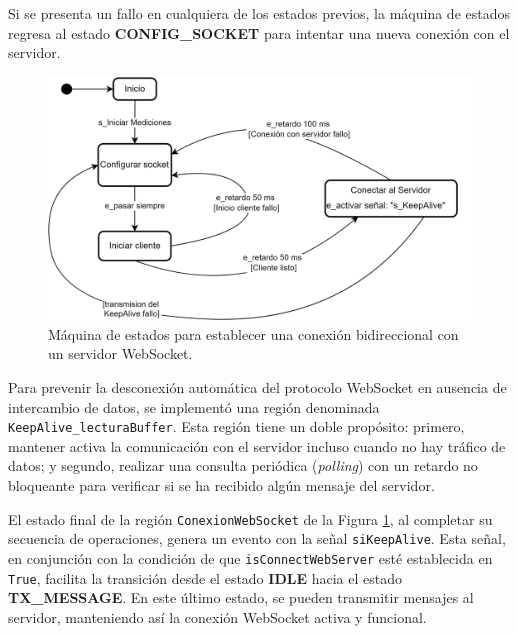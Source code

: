 Si se presenta un fallo en cualquiera de los estados previos, la máquina de estados regresa al estado \textbf{CONFIG\_SOCKET} para intentar una nueva conexión con el servidor.

\begin{figure}[H]
    \centering
    \includegraphics[width=0.8\linewidth]{Figuras/datalogger/Firmware/sc_connectionWebSocket.png}
    \caption{Máquina de estados para establecer una conexión bidireccional con un servidor WebSocket.}
    \label{fig:connectWebSocket}
\end{figure}

Para prevenir la desconexión automática del protocolo WebSocket en ausencia de intercambio de datos, se implementó una región denominada \texttt{KeepAlive\_lecturaBuffer}. Esta región tiene un doble propósito: primero, mantener activa la comunicación con el servidor incluso cuando no hay tráfico de datos; y segundo, realizar una consulta periódica (\textit{polling}) con un retardo no bloqueante para verificar si se ha recibido algún mensaje del servidor.

El estado final de la región \texttt{ConexionWebSocket} de la Figura \ref{fig:connectWebSocket}, al completar su secuencia de operaciones, genera un evento con la señal \texttt{siKeepAlive}. Esta señal, en conjunción con la condición de que \texttt{isConnectWebServer} esté establecida en \texttt{True}, facilita la transición desde el estado \textbf{IDLE} hacia el estado \textbf{TX\_MESSAGE}. En este último estado, se pueden transmitir mensajes al servidor, manteniendo así la conexión WebSocket activa y funcional.



